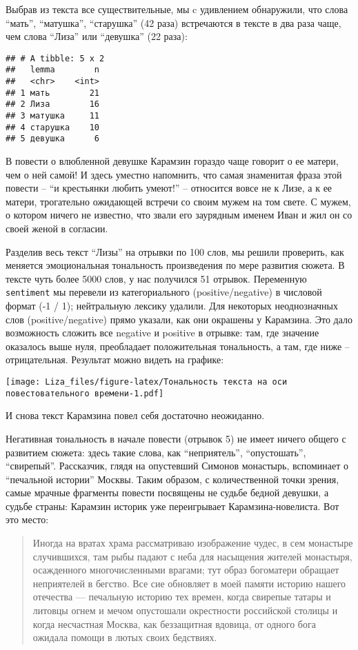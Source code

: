 \documentclass[
]{article}
\begin{document}
Выбрав из текста все существительные, мы c удивлением обнаружили, что
слова ``мать'', ``матушка'', ``старушка'' (42 раза) встречаются в тексте
в два раза чаще, чем слова ``Лиза'' или ``девушка'' (22 раза):

\begin{verbatim}
## # A tibble: 5 x 2
##   lemma        n
##   <chr>    <int>
## 1 мать        21
## 2 Лиза        16
## 3 матушка     11
## 4 старушка    10
## 5 девушка      6
\end{verbatim}

В повести о влюбленной девушке Карамзин гораздо чаще говорит о ее
матери, чем о ней самой! И здесь уместно напомнить, что самая знаменитая
фраза этой повести -- ``и крестьянки любить умеют!'' -- относится вовсе
не к Лизе, а к ее матери, трогательно ожидающей встречи со своим мужем
на том свете. С мужем, о котором ничего не известно, что звали его
заурядным именем Иван и жил он со своей женой в согласии.

Разделив весь текст ``Лизы'' на отрывки по 100 слов, мы решили
проверить, как меняется эмоциональная тональность произведения по мере
развития сюжета. В тексте чуть более 5000 слов, у нас получился 51
отрывок. Переменную \texttt{sentiment} мы перевели из категориального
(positive/negative) в числовой формат (-1 / 1); нейтральную лексику
удалили. Для некоторых неоднозначных слов (positive/negative) прямо
указали, как они окрашены у Карамзина. Это дало возможность сложить все
negative и positive в отрывке: там, где значение оказалось выше нуля,
преобладает положительная тональность, а там, где ниже -- отрицательная.
Результат можно видеть на графике:

\texttt{[image: Liza\_files/figure-latex/Тональность текста на оси повестовательного времени-1.pdf]}

И снова текст Карамзина повел себя достаточно неожиданно.

Негативная тональность в начале повести (отрывок 5) не имеет ничего
общего с развитием сюжета: здесь такие слова, как ``неприятель'',
``опустошать'', ``свирепый''. Рассказчик, глядя на опустевший Симонов
монастырь, вспоминает о ``печальной истории'' Москвы. Таким образом, с
количественной точки зрения, самые мрачные фрагменты повести посвящены
не судьбе бедной девушки, а судьбе страны: Карамзин историк уже
переигрывает Карамзина-новелиста. Вот это место:

\begin{quote}
Иногда на вратах храма рассматриваю изображение чудес, в сем монастыре
случившихся, там рыбы падают с неба для насыщения жителей монастыря,
осажденного многочисленными врагами; тут образ богоматери обращает
неприятелей в бегство. Все сие обновляет в моей памяти историю нашего
отечества --- печальную историю тех времен, когда свирепые татары и
литовцы огнем и мечом опустошали окрестности российской столицы и когда
несчастная Москва, как беззащитная вдовица, от одного бога ожидала
помощи в лютых своих бедствиях.
\end{quote}
\end{document}
